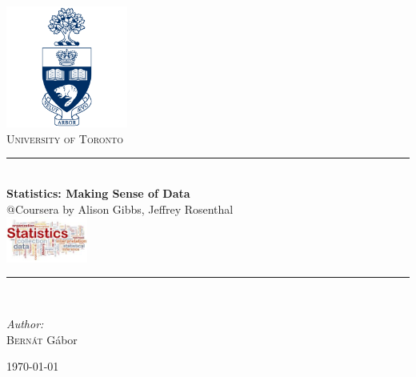\hypersetup{pageanchor=false}
\begin{titlepage}
\newcommand{\HRule}{\rule{\linewidth}{0.5mm}}
\begin{center}

\includegraphics[width=0.3\textwidth]{./img/university-of-toronto-logo.png}\\
\textsc{University of Toronto}\\

\HRule \\[0.4cm]
{ \huge \bfseries Statistics: Making Sense of Data }\\[0.4cm]
{@Coursera by Alison Gibbs, Jeffrey Rosenthal} \\
\includegraphics[width=0.2\textwidth]{./img/introstatslogocropped.jpg}\\
\HRule \\[1.5cm]

\begin{minipage}{0.4\textwidth}
\begin{flushleft} \large
\emph{Author:}\\
\textsc{Bernát} Gábor
\end{flushleft}
\end{minipage}

\vfill
{\large \today}
\end{center}
\end{titlepage}
\hypersetup{pageanchor=false}